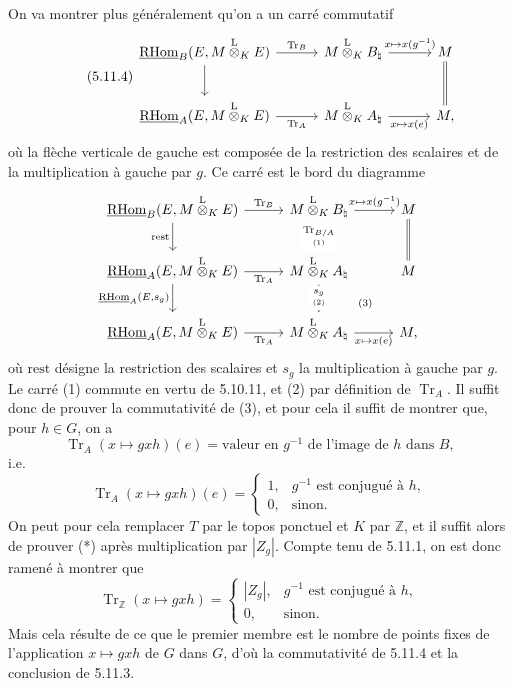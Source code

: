 \documentclass[11pt]{article}
\newcommand{\R}{\mathrm{R}}\newcommand{\RHomCore}{\mathrm{RHom}}
\providecommand{\RHom}{\RHomCore}
\providecommand{\uRHom}{\underline{\RHom}}
\providecommand{\Tr}{\operatorname{Tr}}
\providecommand{\Tr}{\operatorname{Tr}}
\providecommand{\lten}{\overset{\mathrm L}{\otimes}}
\providecommand{\Tr}{\operatorname{Tr}}
\providecommand{\RHom}{\RHomCore}
\providecommand{\lten}{\overset{\mathrm L}{\otimes}}
\providecommand{\RHom}{\R\mathcal{H}om}
\providecommand{\lten}{\overset{\mathrm L}{\otimes}}
\providecommand{\R}{\mathrm R}
\providecommand{\Tr}{\operatorname{Tr}}
\providecommand{\lten}{\overset{\mathrm L}{\otimes}}
\providecommand{\lten}{\overset{\mathrm L}{\otimes}}
\providecommand{\lten}{\overset{\mathrm L}{\otimes}}
\providecommand{\RHom}{\RHomCore}
\providecommand{\Tr}{\operatorname{Tr}}
\providecommand{\lten}{\overset{\mathrm L}{\otimes}}
\begin{document}
On va montrer plus généralement qu'on a un carré commutatif
\begin{equation}\tag{5.11.4}
\begin{tikzcd}[column sep=3.0em,row sep=2.2em]
\uRHom_B(E,M\lten_KE) \arrow[r,"\Tr_B"] \arrow[d] &
M\lten_KB_\natural \arrow[r,"{x\mapsto x(g^{-1})}"] &
M \arrow[d,equal] \\
\uRHom_A(E,M\lten_KE) \arrow[r,"\Tr_A"'] &
M\lten_KA_\natural \arrow[r,"{x\mapsto x(e)}"'] &
M,
\end{tikzcd}
\end{equation}
où la flèche verticale de gauche est composée de la restriction des scalaires et de la multiplication à gauche par $g$. Ce carré est le bord du diagramme
\[
\begin{tikzcd}[column sep=2.8em,row sep=2.0em]
\uRHom_B(E,M\lten_KE) \arrow[r,"\Tr_B"] \arrow[d,"\mathrm{rest}"'] &
M\lten_KB_\natural \arrow[r,"{x\mapsto x(g^{-1})}"] \arrow[d,"{\underset{(1)}{\Tr_{B/A}}}" description] &
M \arrow[d,equal] \\
\uRHom_A(E,M\lten_KE) \arrow[r,"\Tr_A"'] \arrow[d,"{\uRHom_A(E,s_g)}"'] &
M\lten_KA_\natural \arrow[d,"{\underset{(2)}{s_g}}" description] \arrow[dr,phantom,"\scriptstyle(3)" description] &
M \\
\uRHom_A(E,M\lten_KE) \arrow[r,"\Tr_A"'] &
M\lten_KA_\natural \arrow[r,"{x\mapsto x(e)}"'] &
M,
\end{tikzcd}
\]
où $\mathrm{rest}$ désigne la restriction des scalaires et $s_g$ la multiplication à gauche par $g$. Le carré (1) commute en vertu de 5.10.11, et (2) par définition de $\Tr_A$. Il suffit donc de prouver la commutativité de (3), et pour cela il suffit de montrer que, pour $h\in G$, on a
\[
\Tr_A(x\mapsto gxh)(e)=\text{valeur en }g^{-1}\text{ de l'image de }h\text{ dans }B,
\]
i.e.
\begin{equation}\tag{*}
\Tr_A(x\mapsto gxh)(e)=
\begin{cases}
1,& g^{-1}\text{ est conjugué à }h,\\
0,& \text{sinon}.
\end{cases}
\end{equation}
On peut pour cela remplacer $T$ par le topos ponctuel et $K$ par $\mathbb Z$, et il suffit alors de prouver (*) après multiplication par $|Z_g|$. Compte tenu de 5.11.1, on est donc ramené à montrer que
\[
\Tr_{\mathbb Z}(x\mapsto gxh)=
\begin{cases}
|Z_g|,& g^{-1}\text{ est conjugué à }h,\\
0,& \text{sinon}.
\end{cases}
\]
Mais cela résulte de ce que le premier membre est le nombre de points fixes de l'application $x\mapsto gxh$ de $G$ dans $G$, d'où la commutativité de 5.11.4 et la conclusion de 5.11.3.
\end{document}
